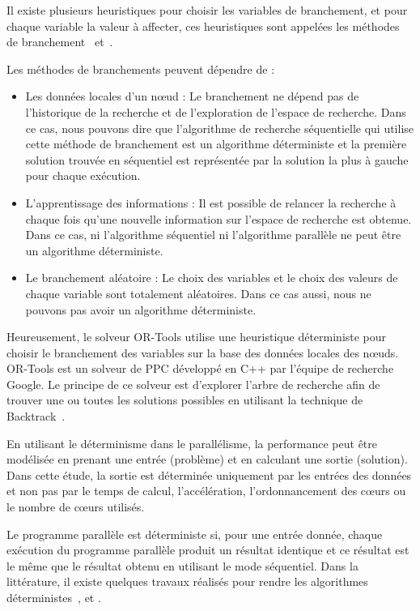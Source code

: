 \documentclass[parallelisme]{compas2014}
\begin{document}
Il existe plusieurs heuristiques pour choisir les variables de branchement, et pour chaque variable la valeur à affecter, ces heuristiques sont appelées les méthodes de branchement~\cite {WM04} et~\cite{11HYSM09}.

Les méthodes de branchements peuvent dépendre de :

\begin{itemize}
\item Les données locales d'un nœud : Le branchement ne dépend pas de l'historique de la recherche et de l'exploration de l'espace de recherche. Dans ce cas, nous pouvons dire que l'algorithme de recherche séquentielle qui utilise cette méthode de branchement est un algorithme déterministe et la première solution trouvée en séquentiel est représentée par la solution la plus à gauche pour chaque exécution.

\item L'apprentissage des informations : Il est possible de relancer la recherche à chaque fois qu'une nouvelle information sur l'espace de recherche est obtenue. Dans ce cas, ni l'algorithme séquentiel ni l'algorithme parallèle ne peut être un algorithme déterministe.

\item Le branchement aléatoire : Le choix des variables et le choix des valeurs de chaque variable sont totalement aléatoires. Dans ce cas aussi, nous ne pouvons pas avoir un algorithme déterministe.
\end{itemize}

Heureusement, le solveur OR-Tools utilise une heuristique déterministe pour choisir le branchement des variables sur la base des données locales des nœuds. OR-Tools est un solveur de PPC développé en C++ par l'équipe de recherche Google. Le principe de ce solveur est d'explorer l'arbre de recherche afin de trouver une ou toutes les solutions possibles en utilisant la technique de Backtrack~\cite{BJRE75}.

En utilisant le déterminisme dans le parallélisme, la performance peut être modélisée en prenant une entrée (problème) et en calculant une sortie (solution). Dans cette étude, la sortie est déterminée uniquement par les entrées des données et non pas par le temps de calcul, l'accélération, l'ordonnancement des cœurs ou le nombre de cœurs utilisés.

Le programme parallèle est déterministe si, pour une entrée donnée, chaque exécution du programme parallèle produit un résultat identique et ce résultat est le même que le résultat obtenu en utilisant le mode séquentiel. Dans la littérature, il existe quelques travaux réalisés pour rendre les algorithmes déterministes~\cite{BAAS09}, \cite{OMAJAS09} et \cite{ DJLBCLOM09}.
\end{document}
